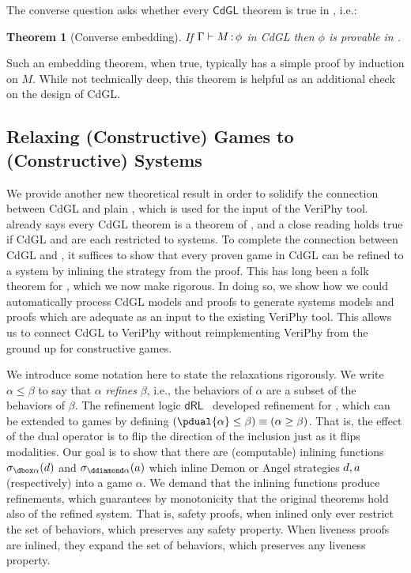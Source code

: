 \documentclass[12pt]{cmuthesis}
\newtheorem{theorem}{Theorem}
\theoremstyle{definition}
\theoremstyle{remark}
\newcommand{\rref}[2][]{\prettyref{#2}}
\newcommand{\dRL}{\ensuremath{\mathsf{dRL}}\xspace}
\newcommand{\CdGL}{\textsf{CdGL}\xspace}
\newcommand{\VeriPhy}{VeriPhy\xspace}
\begin{document}
The converse question asks whether every $\CdGL$ theorem is true in \dGL, i.e.:
\begin{theorem}[Converse embedding]
If $\Gamma\allowbreak\vdash M \allowbreak \mathop{:} \phi$ in \CdGL then $\phi$ is provable in \dGL.
\label{thm:conv-embed}
\end{theorem}
Such an embedding theorem, when true, typically has a simple proof by induction on $M$.
While not technically deep, this theorem is helpful as an additional check on the design of \CdGL.

\subsection{Relaxing (Constructive) Games to (Constructive) Systems}
We provide another new theoretical result in order to solidify the connection between \CdGL and plain \dL, which is used for the input of the \VeriPhy tool.
\rref{thm:conv-embed} already says every \CdGL theorem is a theorem of \dGL, and a close reading holds true if \CdGL and \dGL are each restricted to systems.
To complete the connection between \CdGL and \dL, it suffices to show that every proven game in \CdGL can be refined to a system by inlining the strategy from the proof.
This has long been a folk theorem for \dGL, which we now make rigorous.
In doing so, we show how we could automatically process \CdGL models and proofs to generate systems models and proofs which are adequate as an input to the existing \VeriPhy tool.
This allows us to connect \CdGL to \VeriPhy without reimplementing \VeriPhy from the ground up for constructive games.

We introduce some notation here to state the relaxations rigorously.
We write $\alpha \leq \beta$ to say that $\alpha$ \emph{refines} $\beta$, i.e., the behaviors of $\alpha$ are a subset of the behaviors of $\beta$.
The refinement logic \dRL~\cite{DBLP:conf/lics/LoosP16} developed refinement for \dL, which can be extended to games by defining $(\pdual{\alpha} \leq \beta) \equiv (\alpha \geq \beta)$.
That is, the effect of the dual operator is to flip the direction of the inclusion just as it flips modalities.
Our goal is to show that there are (computable) inlining functions $\dinline{\alpha}{\da}$ and $\ainline{\alpha}{\aa}$ which inline Demon or Angel strategies $d,a$ (respectively) into a game $\alpha$.
We demand that the inlining functions produce refinements, which guarantees by monotonicity that the original theorems hold also of the refined system.
That is, safety proofs, when inlined only ever restrict the set of behaviors, which preserves any safety property.
When liveness proofs are inlined, they expand the set of behaviors, which preserves any liveness property.
\end{document}
